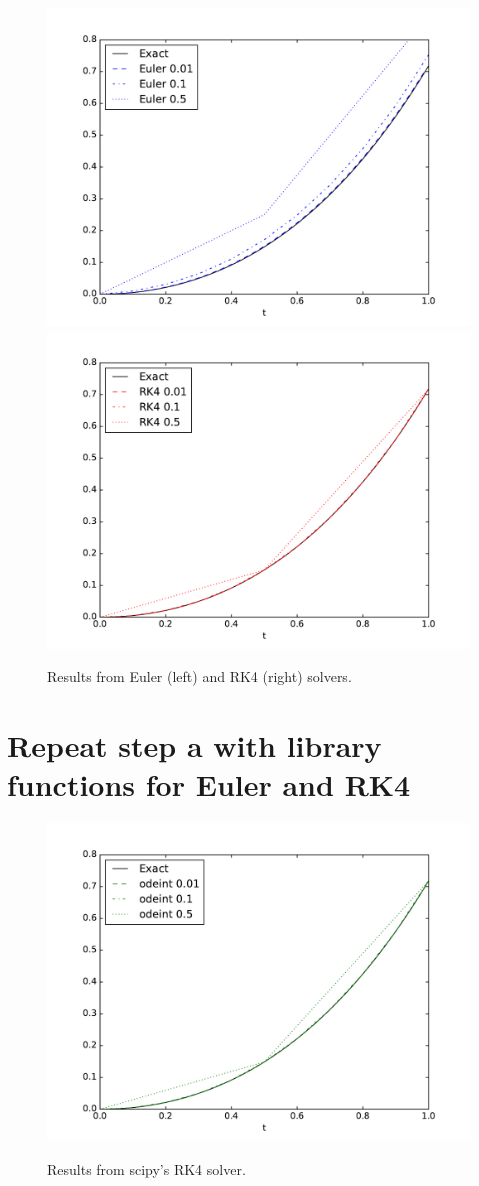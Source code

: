 \documentclass[onecolumn,10pt]{jhwhw}
\begin{document}
\begin{figure}[h!]
\begin{center}
\includegraphics[width=.45\textwidth]{euler.pdf}
\includegraphics[width=.45\textwidth]{rk4.pdf}
\label{fig:on}
\end{center}
\caption{Results from Euler (left) and RK4 (right) solvers.}
\end{figure}

\part{Repeat step a with library functions for Euler and RK4}
\begin{figure}[h!]
\begin{center}
\includegraphics[width=.5\textwidth]{odeint.pdf}
\label{fig:on}
\end{center}
\caption{Results from scipy's RK4 solver.}
\end{figure}
\end{document}
